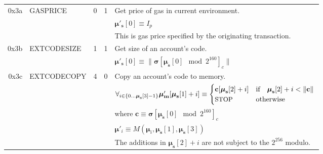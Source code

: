 \documentclass[9pt,oneside]{amsart}
\begin{document}
\begin{tabular*}{\columnwidth}[h]{rlrrl}
\midrule
0x3a & {\small GASPRICE} & 0 & 1 & Get price of gas in current environment. \\
&&&& $\boldsymbol{\mu}'_\mathbf{s}[0] \equiv I_p$ \\
&&&& This is gas price specified by the originating transaction.\\
\midrule
0x3b & {\small EXTCODESIZE} & 1 & 1 & Get size of an account's code. \\
&&&& $\boldsymbol{\mu}'_\mathbf{s}[0] \equiv \lVert \boldsymbol{\sigma}[\boldsymbol{\mu}_\mathbf{s}[0] \mod 2^{160}]_c \rVert$ \\
\midrule
0x3c & {\small EXTCODECOPY} & 4 & 0 & Copy an account's code to memory. \\
&&&& $\forall_{i \in \{ 0 \dots \boldsymbol{\mu}_\mathbf{s}[3] - 1\} } \boldsymbol{\mu}'_\mathbf{m}[\boldsymbol{\mu}_\mathbf{s}[1] + i ] \equiv
\begin{cases} \mathbf{c}[\boldsymbol{\mu}_\mathbf{s}[2] + i] & \text{if} \quad \boldsymbol{\mu}_\mathbf{s}[2] + i < \lVert \mathbf{c} \rVert \\ \text{\small STOP} & \text{otherwise} \end{cases}$\\
&&&& where $\mathbf{c} \equiv \boldsymbol{\sigma}[\boldsymbol{\mu}_\mathbf{s}[0] \mod 2^{160}]_c$ \\
&&&& $\boldsymbol{\mu}'_i \equiv M(\boldsymbol{\mu}_i, \boldsymbol{\mu}_\mathbf{s}[1], \boldsymbol{\mu}_\mathbf{s}[3])$ \\
&&&& The additions in $\boldsymbol{\mu}_\mathbf{s}[2] + i$ are not subject to the $2^{256}$ modulo. \\
\bottomrule
\end{tabular*}
\end{document}
